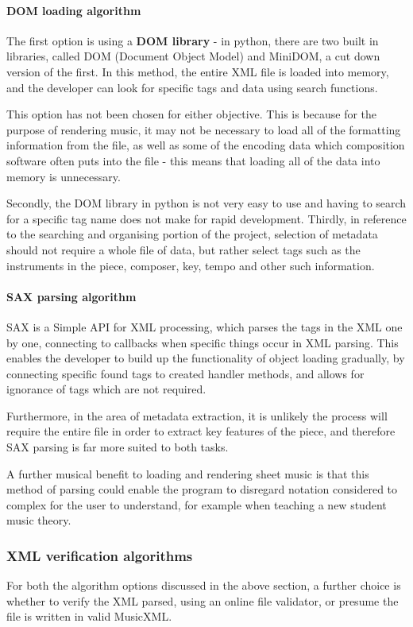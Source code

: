 \paragraph{DOM loading algorithm}
The first option is using a \textbf{DOM library} - in python, there are two built in libraries, called DOM (Document Object Model) and MiniDOM, a cut down version of the first. In this method, the entire XML file is loaded into memory, and the developer can look for specific tags and data using search functions.

This option has not been chosen for either objective. This is because for the purpose of rendering music, it may not be necessary to load all of the formatting information from the file, as well as some of the encoding data which composition software often puts into the file - this means that loading all of the data into memory is unnecessary. 

Secondly, the DOM library in python is not very easy to use and having to search for a specific tag name does not make for rapid development.
Thirdly, in reference to the searching and organising portion of the project, selection of metadata should not require a whole file of data, but rather select tags such as the instruments in the piece, composer, key, tempo and other such information.

\paragraph{SAX parsing algorithm}
SAX is a Simple API for XML processing, which parses the tags in the XML one by one, connecting to callbacks when specific things occur in XML parsing. This enables the developer to build up the functionality of object loading gradually, by connecting specific found tags to created handler methods, and allows for ignorance of tags which are not required.

Furthermore, in the area of metadata extraction, it is unlikely the process will require the entire file in order to extract key features of the piece, and therefore SAX parsing is far more suited to both tasks.

A further musical benefit to loading and rendering sheet music is that this method of parsing could enable the program to disregard notation considered to complex for the user to understand, for example when teaching a new student music theory.

\subsubsection{XML verification algorithms}
For both the algorithm options discussed in the above section, a further choice is whether to verify the XML parsed, using an online file validator, or presume the file is written in valid MusicXML. 

